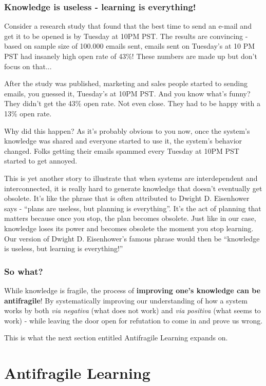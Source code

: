 \documentclass{article}
\begin{document}
\subsubsection{Knowledge is useless - learning is everything!}

Consider a research study that found that the best time to send an e-mail and get it to be opened is by Tuesday at 10PM PST. The results are convincing - based on sample size of 100.000 emails sent, emails sent on Tuesday's at 10 PM PST had insanely high open rate of 43\%! These numbers are made up but don't focus on that...

After the study was published, marketing and sales people started to sending emails, you guessed it, Tuesday's at 10PM PST. And you know what's funny? They didn't get the 43\% open rate. Not even close. They had to be happy with a 13\% open rate. 

Why did this happen? As it's probably obvious to you now, once the system's knowledge was shared and everyone started to use it, the system's behavior changed. Folks getting their emails spammed every Tuesday at 10PM PST started to get annoyed.

This is yet another story to illustrate that when systems are interdependent and interconnected, it is really hard to generate knowledge that doesn't eventually get obsolete. It's like the phrase that is often attributed to Dwight D. Eisenhower says - ``plans are useless, but planning is everything''. It's the act of planning that matters because once you stop, the plan becomes obsolete. Just like in our case, knowledge loses its power and becomes obsolete the moment you stop learning. Our version of Dwight D. Eisenhower's famous phrase would then be ``knowledge is useless, but learning is everything!''

\subsubsection{So what?}
While knowledge is fragile, the process of \textbf{improving one's knowledge can be antifragile}!
By systematically improving our understanding of how a system works by both \emph{via negativa} (what does not work) and \emph{via positiva} (what seems to work) - while leaving the door open for refutation to come in and prove us wrong.

This is what the next section entitled Antifragile Learning expands on.

\section{Antifragile Learning}
\end{document}
